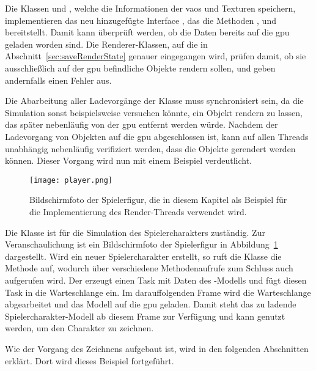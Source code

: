 Die Klassen \classRawModel{} und \classModelTexture{}, welche die Informationen der \acp{vao} und Texturen speichern, implementieren das neu hinzugefügte Interface \classAsyncGraphicsObject{}, das die Methoden 	, 
 und 
 bereitstellt. Damit kann überprüft werden, ob die Daten bereits auf die \ac{gpu} geladen worden sind. Die Renderer-Klassen, auf die in Abschnitt~\ref{sec:saveRenderState} genauer eingegangen wird, prüfen damit, ob sie ausschließlich auf der \ac{gpu} befindliche Objekte rendern sollen, und geben andernfalls einen Fehler aus.

Die Abarbeitung aller Ladevorgänge der Klasse \classLoader{} muss synchronisiert sein, da die Simulation sonst beispielsweise versuchen könnte, ein Objekt rendern zu lassen, das später nebenläufig von der \ac{gpu} entfernt werden würde. Nachdem der Ladevorgang von Objekten auf die \ac{gpu} abgeschlossen ist, kann auf allen Threads unabhängig nebenläufig verifiziert werden, dass die Objekte gerendert werden können. Dieser Vorgang wird nun mit einem Beispiel verdeutlicht.

\begin{figure}
	\centering
	\texttt{[image: player.png]}
	\caption[Bildschirmfoto der Spielerfigur in der Blocklib.]{Bildschirmfoto der Spielerfigur, die in diesem Kapitel als Beispiel für die Implementierung des Render-Threads verwendet wird.}\label{fig:player}
\end{figure}

\begin{example}
	Die Klasse \classPlayer{} ist für die Simulation des Spielercharakters zuständig. Zur Veranschaulichung ist ein Bildschirmfoto der Spielerfigur in Abbildung~\ref{fig:player} dargestellt. Wird ein neuer Spielercharakter erstellt, so ruft die Klasse \classPlayer{} die Methode  auf, wodurch über verschiedene Methodenaufrufe zum Schluss auch  aufgerufen wird. Der \classLoader{} erzeugt einen Task mit Daten des \classPlayer{}-Modells und fügt diesen Task in die Warteschlange ein. Im darauffolgenden Frame wird die Warteschlange abgearbeitet und das Modell auf die \ac{gpu} geladen. Damit steht das zu ladende Spielercharakter-Modell ab diesem Frame zur Verfügung und kann genutzt werden, um den Charakter zu zeichnen. 

	Wie der Vorgang des Zeichnens aufgebaut ist, wird in den folgenden Abschnitten erklärt. Dort wird dieses Beispiel fortgeführt.
\end{example}


